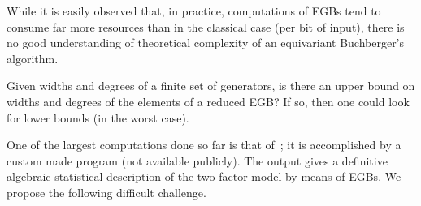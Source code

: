 

While it is easily observed that, in practice, computations of EGBs tend to consume far more resources than in the classical case (per bit of input), there is no good understanding of theoretical complexity of an equivariant Buchberger's algorithm.

\begin{question}
Given widths and degrees of a finite set of generators, is there an upper bound on widths and degrees of the elements of a reduced EGB?
If so, then one could look for lower bounds (in the worst case). 
\end{question}






One of the largest computations done so far is that of~\cite{Brouwer09e}; it is accomplished by a custom made program (not available publicly). The output gives a definitive algebraic-statistical description of the two-factor model by means of EGBs.  We propose the following difficult challenge.


